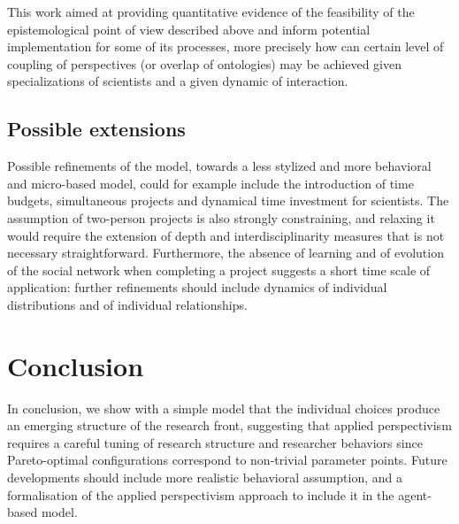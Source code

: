 \documentclass[utf8,11pt]{article}
\begin{document}
This work aimed at providing quantitative evidence of the feasibility of the epistemological point of view described above and inform potential implementation for some of its processes, more precisely how can certain level of coupling of perspectives (or overlap of ontologies) may be achieved given specializations of scientists and a given dynamic of interaction.


\subsection{Possible extensions}

Possible refinements of the model, towards a less stylized and more behavioral and micro-based model, could for example include the introduction of time budgets, simultaneous projects and dynamical time investment for scientists. The assumption of two-person projects is also strongly constraining, and relaxing it would require the extension of depth and interdisciplinarity measures that is not necessary straightforward. Furthermore, the absence of learning and of evolution of the social network when completing a project suggests a short time scale of application: further refinements should include dynamics of individual distributions and of individual relationships.


\section{Conclusion}

In conclusion, we show with a simple model that the individual choices produce an emerging structure of the research front, suggesting that applied perspectivism requires a careful tuning of research structure and researcher behaviors since Pareto-optimal configurations correspond to non-trivial parameter points. Future developments should include more realistic behavioral assumption, and a formalisation of the applied perspectivism approach to include it in the agent-based model.





\end{document}

